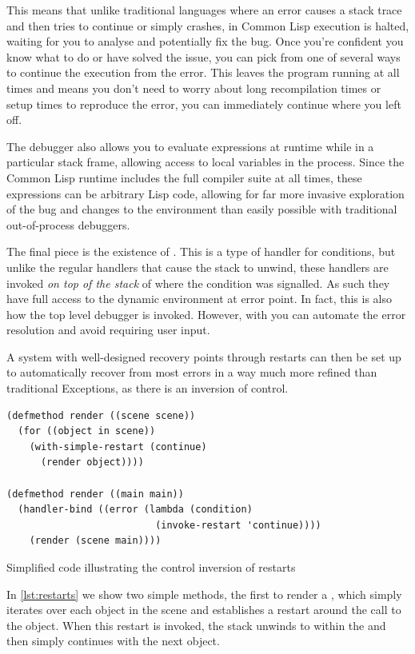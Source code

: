 \documentclass[a4paper]{paper}
\begin{document}
This means that unlike traditional languages where an error causes a stack trace and then tries to continue or simply crashes, in Common Lisp execution is halted, waiting for you to analyse and potentially fix the bug. Once you're confident you know what to do or have solved the issue, you can pick from one of several ways to continue the execution from the error. This leaves the program running at all times and means you don't need to worry about long recompilation times or setup times to reproduce the error, you can immediately continue where you left off.

The debugger also allows you to evaluate expressions at runtime while in a particular stack frame, allowing access to local variables in the process. Since the Common Lisp runtime includes the full compiler suite at all times, these expressions can be arbitrary Lisp code, allowing for far more invasive exploration of the bug and changes to the environment than easily possible with traditional out-of-process debuggers.

The final piece is the existence of . This is a type of handler for conditions, but unlike the regular handlers that cause the stack to unwind, these handlers are invoked \textit{on top of the stack} of where the condition was signalled. As such they have full access to the dynamic environment at error point. In fact, this is also how the top level debugger is invoked. However, with  you can automate the error resolution and avoid requiring user input.

A system with well-designed recovery points through restarts can then be set up to automatically recover from most errors in a way much more refined than traditional Exceptions, as there is an inversion of control.

\begin{listing}[H]
\begin{verbatim}
(defmethod render ((scene scene))
  (for ((object in scene))
    (with-simple-restart (continue)
      (render object))))

(defmethod render ((main main))
  (handler-bind ((error (lambda (condition)
                          (invoke-restart 'continue))))
    (render (scene main))))
\end{verbatim}
\caption{Simplified code illustrating the control inversion of restarts}
\label{lst:restarts}
\end{listing}

In \autoref{lst:restarts} we show two simple methods, the first to render a , which simply iterates over each object in the scene and establishes a  restart around the call to  the object. When this restart is invoked, the stack unwinds to within the  and then simply continues with the next object.
\end{document}
